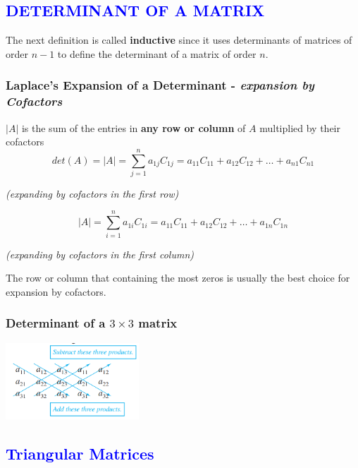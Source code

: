 \documentclass{article}
\newcommand\B{\textbf}
\newcommand\tcl{\begin{tcolorbox}[colback = {blue9}]}
\newcommand\etcl{\end{tcolorbox}}
\newcommand\x{\times}
\begin{document}
        \subsection*{\textcolor{blue}{DETERMINANT OF A MATRIX}}
        The next definition is called \B{inductive} since it uses determinants of matrices of order $n - 1$ to 
        define the determinant of a matrix of order $n$.
        \subsubsection*{Laplace's Expansion of a Determinant - \textit{expansion by Cofactors}}
        \tcl
            $|A|$ is the sum of the entries in \B{any row or column} of $A$ multiplied by their cofactors
            \[det(A) = |A| = \sum_{j=1}^n a_{1j}C_{1j} = a_{11}C_{11} + a_{12}C_{12} + \dots + a_{n1}C_{n1}\]
            \begin{center}
                \footnotesize \textit{(expanding by cofactors in the first row)}
            \end{center}
            \[|A| = \sum_{i = 1}^n a_{1i}C_{1i} = a_{11}C_{11} + a_{12}C_{12} + \dots + a_{1n}C_{1n}\]
            \begin{center}
                \footnotesize \textit{(expanding by cofactors in the first column)}
            \end{center}
        \etcl
        The row or column that containing the most zeros is usually the best choice for expansion by cofactors.
        
        \subsubsection*{Determinant of a $3 \x 3$ matrix}

        \begin{center}
            \includegraphics*[width = 5cm]{images/det3.png}
        \end{center}

        \subsection*{\textcolor{blue}{Triangular Matrices}}
\end{document}
